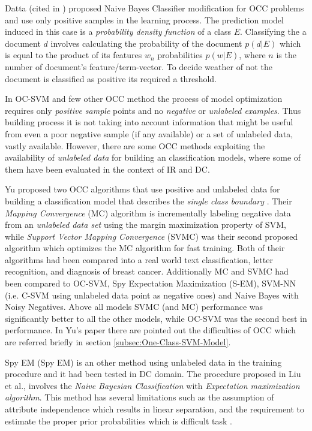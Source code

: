 Datta (cited in \cite{manevitz2002one}) proposed Naive Bayes Classifier modification for OCC problems and use only positive samples in the learning process. The prediction model induced in this case is a \textit{probability density function} of a class $E$. Classifying the a document $d$ involves calculating the probability of the document $p(d|E)$ which is equal to the product of its features $w_{n}$ probabilities $p(w|E)$, where $n$ is the number of document's feature/term-vector. To decide weather of not the document is classified as positive its required
a threshold. 

In OC-SVM and few other OCC method the process of model optimization requires only \textit{positive sample} points and no \textit{negative} or \textit{unlabeled examples}. Thus building process it is not taking into account information that might be useful from even a poor negative sample (if any available) or a set of unlabeled data, vastly available. However, there are some OCC methods exploiting the availability of \textit{unlabeled data} for building an classification models, where some of them have been evaluated in the context of IR and DC. 

Yu proposed two OCC algorithms that use positive and unlabeled data for building a classification model that describes the \textit{single class boundary} \cite{yu2005single}. Their \textit{Mapping Convergence }(MC) algorithm is incrementally labeling negative data from an \textit{unlabeled data set} using the margin maximization property of SVM, while \textit{Support Vector Mapping Convergence} (SVMC) was their second proposed algorithm which optimizes the MC algorithm for fast training. Both of their algorithms had been compared into a real world text classification, letter recognition, and diagnosis of breast cancer. Additionally MC and SVMC had been compared to OC-SVM, Spy Expectation Maximization (S-EM), SVM-NN (i.e. C-SVM using unlabeled data point as negative ones) and Naive Bayes with Noisy Negatives. Above all models SVMC (and MC) performance was significantly better to all the other models, while OC-SVM was the second best in performance. In Yu's paper there are pointed out the difficulties of OCC which are referred briefly in section \ref{subsec:One-Class-SVM-Model}.

Spy EM (Spy EM) is an other method using unlabeled data in the training procedure and it had been tested in DC domain. The procedure proposed in Liu et al.\cite{liu2002partially}, involves the \textit{Naive Bayesian Classification} with \textit{Expectation maximization algorithm}. This method has several limitations such as the assumption of attribute independence which results in linear separation, and the requirement to estimate the proper prior probabilities which is difficult task \cite{yu2005single}.

